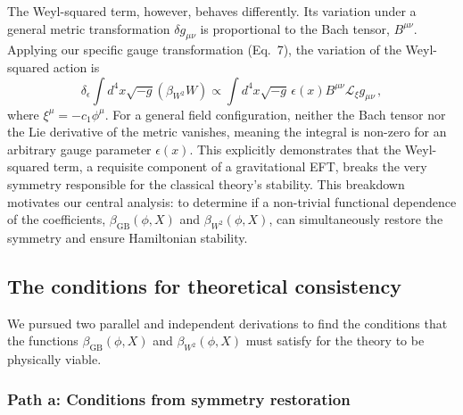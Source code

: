 \documentclass[twocolumn]{aastex631}
\begin{document}
The Weyl-squared term, however, behaves differently. Its variation under a general metric transformation $\delta g_{\mu\nu}$ is proportional to the Bach tensor, $B^{\mu\nu}$. Applying our specific gauge transformation (Eq.~7), the variation of the Weyl-squared action is
\begin{equation}
    \delta_\epsilon \int d^4x \sqrt{-g} (\beta_{W^2} W) \propto \int d^4x \sqrt{-g} \, \epsilon(x) B^{\mu\nu} \mathcal{L}_{\xi} g_{\mu\nu} \,,
\end{equation}
where $\xi^\mu = -c_1 \phi^\mu$. For a general field configuration, neither the Bach tensor nor the Lie derivative of the metric vanishes, meaning the integral is non-zero for an arbitrary gauge parameter $\epsilon(x)$. This explicitly demonstrates that the Weyl-squared term, a requisite component of a gravitational EFT, breaks the very symmetry responsible for the classical theory's stability. This breakdown motivates our central analysis: to determine if a non-trivial functional dependence of the coefficients, $\beta_{\text{GB}}(\phi, X)$ and $\beta_{W^2}(\phi, X)$, can simultaneously restore the symmetry and ensure Hamiltonian stability.

\subsection{The conditions for theoretical consistency}

We pursued two parallel and independent derivations to find the conditions that the functions $\beta_{\text{GB}}(\phi, X)$ and $\beta_{W^2}(\phi, X)$ must satisfy for the theory to be physically viable.

\subsubsection{Path a: Conditions from symmetry restoration}
\end{document}

